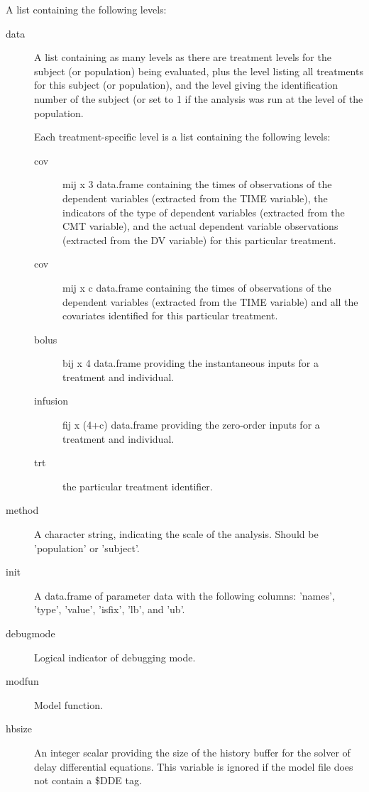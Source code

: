 \begin{Arguments}
\begin{ldescription}
\item[\code{problem}] A list containing the following levels:\begin{description}

\item[data] A list containing as many levels as there are treatment levels 
for the subject (or population) being evaluated, plus the  
level listing all treatments for this subject (or population), and the 
 level giving the identification number of the subject (or set to
1 if the analysis was run at the level of the population.

Each treatment-specific level is a list containing the following levels: 
\begin{description}

\item[cov] mij x 3 data.frame containing the times of observations of the
dependent variables (extracted from the TIME variable), the indicators
of the type of dependent variables (extracted from the CMT variable),
and the actual dependent variable observations (extracted from the 
DV variable) for this particular treatment.
\item[cov] mij x c data.frame containing the times of observations of 
the dependent variables (extracted from the TIME variable) and all the
covariates identified for this particular treatment.
\item[bolus] bij x 4 data.frame providing the instantaneous inputs 
for a treatment and individual.
\item[infusion] fij x (4+c) data.frame providing the zero-order inputs for
a treatment and individual.
\item[trt] the particular treatment identifier.
\end{description}


\item[method] A character string, indicating the scale of the analysis. Should
be 'population' or 'subject'.
\item[init] A data.frame of parameter data with the following columns:
'names', 'type', 'value', 'isfix', 'lb', and 'ub'.
\item[debugmode] Logical indicator of debugging mode.
\item[modfun] Model function.
\item[hbsize] An integer scalar providing the size of the history buffer for
the solver of delay differential equations. This variable is ignored if
the model file does not contain a \$DDE tag.


\end{description}
\end{ldescription}
\end{Arguments}
